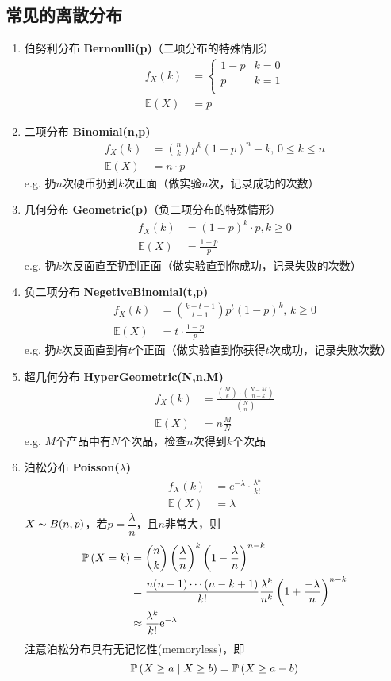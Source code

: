 \subsection{常见的离散分布}
\begin{enumerate}
	\item 伯努利分布 \textbf{Bernoulli(p)}（二项分布的特殊情形）
		\[\begin{aligned}
		f_{X}(k)&=\begin{cases}
		1-p & k=0\\
		p & k=1\\
		\end{cases}\\
		\mathbb{E}(X)&=p
		\end{aligned}\]
	\item 二项分布 \textbf{Binomial(n,p)}
		\[\begin{aligned}
		f_{X}(k)& =\binom{n}{k}p^k(1-p)^n-k,\,0\leq k\leq n\\
		\mathbb{E}(X)& =n\cdot p
		\end{aligned}\]
		e.g. 扔$n$次硬币扔到$k$次正面（做实验$n$次，记录成功的次数）
	\item 几何分布 \textbf{Geometric(p)}（负二项分布的特殊情形）
		\[\begin{aligned}
		f_{X}(k)& =(1-p)^k\cdot p,k\geq 0\\
		\mathbb{E}(X)& =\frac{1-p}{p}
		\end{aligned}\]
		e.g. 扔$k$次反面直至扔到正面（做实验直到你成功，记录失败的次数）
	\item 负二项分布 \textbf{NegetiveBinomial(t,p)}
		\[\begin{aligned}
		f_{X}(k)& =\binom{k+t-1}{t-1}p^t(1-p)^k,\,k\geq 0\\
		\mathbb{E}(X)& =t\cdot\frac{1-p}{p}
		\end{aligned}\]
		e.g. 扔$k$次反面直到有$t$个正面（做实验直到你获得$t$次成功，记录失败次数）
	\item 超几何分布 \textbf{HyperGeometric(N,n,M)}
		\[\begin{aligned}
		f_{X}(k)& =\frac{\binom{M}{k}\cdot \binom{N-M}{n-k}}{\binom{N}{n}}\\
		\mathbb{E}(X)& =n\frac{M}{N}
		\end{aligned}\]
		e.g. $M$个产品中有$N$个次品，检查$n$次得到$k$个次品
	\item 泊松分布 \textbf{Poisson($\lambda$)}
		\[\begin{aligned}
		f_{X}(k)& =e^{-\lambda}\cdot \frac{\lambda^k}{k!}\\
		\mathbb{E}(X)& =\lambda
		\end{aligned}\]
		$X\thicksim B(n,p)$，若$p=\dfrac{\lambda}{n}$，且$n$非常大，则
		\[\begin{aligned}
		\mathbb{P}\left(X=k\right) &= \binom{n}{k}\left(\frac{\lambda}{n}\right)^k\left(1-\frac{\lambda}{n}\right)^{n-k}\\
		&= \frac{n(n-1)\cdots(n-k+1)}{k!}\frac{\lambda^k}{n^k}\left(1+\frac{-\lambda}{n}\right)^{n-k}\\
		&\approx \frac{\lambda^k}{k!}\mathrm{e}^{-\lambda}
		\end{aligned}\]
		注意泊松分布具有无记忆性(memoryless)，即
		\[\mathbb{P}\left(X\geq a\mid X\geq b\right)=\mathbb{P}\left(X\geq a-b\right)\]
\end{enumerate}

